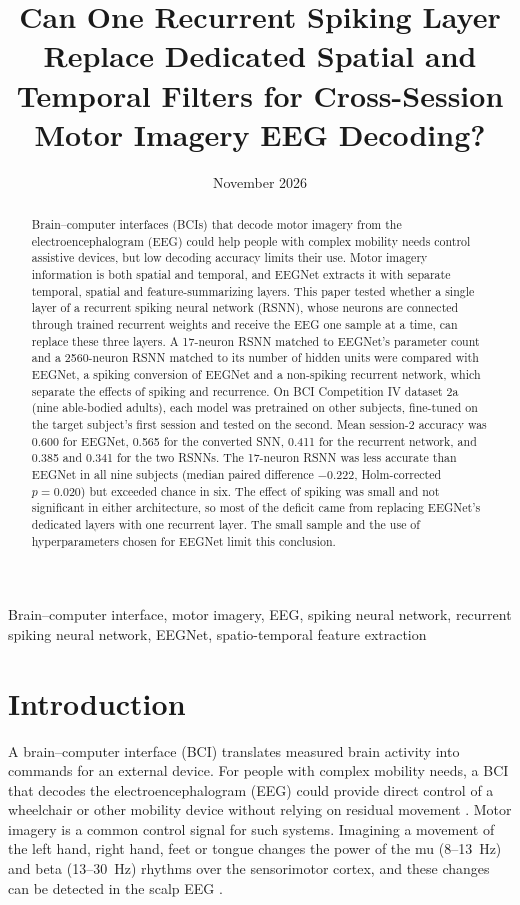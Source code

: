 \documentclass[conference]{IEEEtran}
\title{Can One Recurrent Spiking Layer Replace Dedicated Spatial and Temporal Filters for Cross-Session Motor Imagery EEG Decoding?}
\author{\IEEEauthorblockN{[Author 1], [Author 2], [Author 3]}
\IEEEauthorblockA{[Affiliation]}}
\date{November 2026}
\begin{document}
\maketitle

\begin{abstract}
Brain--computer interfaces (BCIs) that decode motor imagery from the electroencephalogram (EEG) could help people with complex mobility needs control assistive devices, but low decoding accuracy limits their use. Motor imagery information is both spatial and temporal, and EEGNet extracts it with separate temporal, spatial and feature-summarizing layers. This paper tested whether a single layer of a recurrent spiking neural network (RSNN), whose neurons are connected through trained recurrent weights and receive the EEG one sample at a time, can replace these three layers. A 17-neuron RSNN matched to EEGNet's parameter count and a 2560-neuron RSNN matched to its number of hidden units were compared with EEGNet, a spiking conversion of EEGNet and a non-spiking recurrent network, which separate the effects of spiking and recurrence. On BCI Competition IV dataset 2a (nine able-bodied adults), each model was pretrained on other subjects, fine-tuned on the target subject's first session and tested on the second. Mean session-2 accuracy was 0.600 for EEGNet, 0.565 for the converted SNN, 0.411 for the recurrent network, and 0.385 and 0.341 for the two RSNNs. The 17-neuron RSNN was less accurate than EEGNet in all nine subjects (median paired difference $-0.222$, Holm-corrected $p = 0.020$) but exceeded chance in six. The effect of spiking was small and not significant in either architecture, so most of the deficit came from replacing EEGNet's dedicated layers with one recurrent layer. The small sample and the use of hyperparameters chosen for EEGNet limit this conclusion.
\end{abstract}

\begin{IEEEkeywords}
Brain--computer interface, motor imagery, EEG, spiking neural network, recurrent spiking neural network, EEGNet, spatio-temporal feature extraction
\end{IEEEkeywords}

\section{Introduction}
\label{sec:intro}

A brain--computer interface (BCI) translates measured brain activity into commands for an external device. For people with complex mobility needs, a BCI that decodes the electroencephalogram (EEG) could provide direct control of a wheelchair or other mobility device without relying on residual movement \cite{padfield2019}. Motor imagery is a common control signal for such systems. Imagining a movement of the left hand, right hand, feet or tongue changes the power of the mu (8--13~Hz) and beta (13--30~Hz) rhythms over the sensorimotor cortex, and these changes can be detected in the scalp EEG \cite{mcfarland2000,pfurtscheller2006}.
\end{document}
